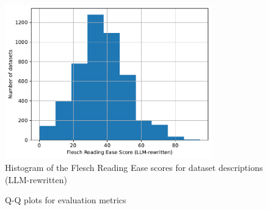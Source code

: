 \begin{figure}[h]
    \centering
    \includegraphics[width=0.8\textwidth]{figures/flesch_reading_ease_prompt.pdf}
    \caption{Histogram of the Flesch Reading Ease scores for dataset descriptions (LLM-rewritten)}
    \label{fig:flesch_reading_ease_rewritten}
\end{figure}


\begin{figure}[h]
    \centering
    \hfill

    \caption{Q-Q plots for evaluation metrics}
    \label{fig:all_qq_plots}
\end{figure}